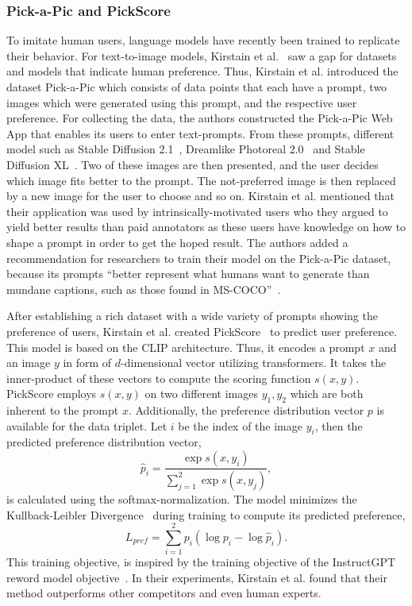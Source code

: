 \subsubsection{Pick-a-Pic and PickScore}
\label{sec:wuerstchen:PickScore}
To imitate human users, language models have recently been trained to replicate
their behavior. For text-to-image models, Kirstain et
al.~\cite{kirstain2023pickapic} saw a gap for datasets and models that
indicate human preference. Thus, Kirstain et al. introduced the dataset
Pick-a-Pic which consists of data points that each have a prompt, two images which
were generated using this prompt, and the respective user preference. For
collecting the data, the authors constructed the Pick-a-Pic Web App that enables
its users to enter text-prompts. From these prompts, different model such as
Stable Diffusion 2.1~\cite{rombach2023sd_2_1}, Dreamlike Photoreal 2.0~\cite{dreamlike_art2024} and
Stable Diffusion XL~\cite{podell2024sdxl}. Two of these images are then
presented, and the user decides which image fits better to the prompt. The
not-preferred image is then replaced by a new image for the user to choose and so on. Kirstain et al.
mentioned that their application was used by intrinsically-motivated users who
they argued to yield better results than paid annotators as these users have
knowledge on how to shape a prompt in order to get the hoped result. The authors
added a recommendation for researchers to train their model on the Pick-a-Pic
dataset, because its prompts ``better represent what humans want to generate
than mundane captions, such as those found in MS-COCO''~\cite{kirstain2023pickapic}.

After establishing a rich dataset with a wide variety of prompts showing the
preference of users, Kirstain et al. created PickScore~\cite{kirstain2023pickapic}
to predict user preference. This model is based on the CLIP architecture. Thus,
it encodes a prompt $x$ and an image $y$ in form of $d$-dimensional
vector utilizing transformers. It takes the inner-product of these vectors to compute the scoring function
$s(x, y)$. PickScore employs $s(x, y)$ on two different images $y_1, y_2$ which
are both inherent to the prompt $x$. Additionally, the preference distribution
vector $p$ is available for the data triplet. Let $i$ be the index of the image
$y_i$, then the predicted preference distribution vector,
\begin{equation*}
    \hat{p}_i = \frac{\exp s(x, y_i)}{\sum_{j=1}^{2}\exp s(x, y_j)},
\end{equation*}
is calculated using the softmax-normalization. The model minimizes the
Kullback-Leibler Divergence~\cite{kullback1951OnInformationandSufficiency} during training to compute its predicted preference,
\begin{equation*}
    L_{pref} = \sum_{i=1}^{2} p_i (\log p_i - \log\hat{p}_i).
\end{equation*}
This training objective, is inspired
by the training objective of the InstructGPT reword model
objective~\cite{Ouyang2024InstructGPT}. In their experiments, Kirstain et al.
found that their method outperforms other competitors and even human experts.


